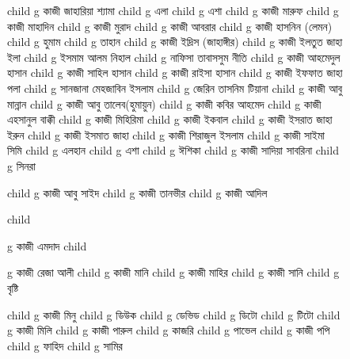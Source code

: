 \documentclass{article}
\begin{document}
\begin{figure}
{\begin{genealogypicture}
{{{{{            child{ g{ কাজী জাহারিয়া শ্যামা  } 
                child{ g{ এলা  }  }
                child{ g{ এশা  }  }
            }
            child{ g{ কাজী মারুফ  }
                child{ g{ কাজী মাহাদিন }  }
              }
            child{ g{ কাজী মুরাদ }
                child{ g{ কাজী আবরার }  }
              }
            child{ g{ কাজী হাসনিন (লেমন) }
              child{ g{ হুমাম  }  }
              child{ g{ তাহান }  }
            }
          }
          child{    g{ কাজী ইদ্রিস (জাহাঙ্গীর) }
                child{ g{ কাজী ইলতুত জাহা ইলা } 
                      child{ g{ ইসমাম আলম নিহাল  }  }
                      child{ g{ নাফিসা তাবাসসুম নীতি }  }
                 } 
                child{ g{ কাজী আহমেদুল হাসান } 
                    child{ g{ কাজী সাহিল হাসান }  }
                    child{ g{ কাজী রাইসা হাসান }  }
                 }
                 child{ g{ কাজী ইফফাত জাহা পলা }
                      child{ g{ সানজানা মেহজাবিন ইসলাম  }  }
                      child{ g{ জেরিন তাসনিম টিয়ানা }  }
                   }
            }
          child{    g{ কাজী আবু মান্নান }   }
          child{   
            g{ কাজী আবু তালেব(হুমায়ুন)  }
              child{ g{ কাজী কবির আহমেদ  }  }
              child{ g{ কাজী এহসানুল বাক্কী }
                  child{ g{ কাজী মিহিরিমা }  }
              }
          }
          child{    g{ কাজী ইকবাল } 
                child{ g{ কাজী ইসরাত জাহা ইরুন }  }
                child{ g{ কাজী ইসমাত জাহা }  }
            }
          child{    g{ কাজী শিরাজুল ইসলাম }  
              child{ g{ কাজী সাইমা সিমি } 
                  child{ g{ এলহান }  }
                  child{ g{ এশা }  }
                  child{ g{ ঈশিকা }  }
              }
              child{ g{ কাজী সাদিয়া সাবরিনা } 
                    child{ g{ সিনরা }  }
              }
           }
        
          child{    g{ কাজী আবু সাইদ }
                  child{ g{ কাজী তানভীর }
                      child{ g{ কাজী আদিল }  }
                    }
             }
          }
          child{    g{ কাজী এমদাদ } 
              child{    g{ কাজী রেজা আলী } 
                    child{    g{ কাজী মানি }
                        child{    g{ কাজী মাহির   }     }
                          }
                    child{    g{ কাজী সানি } child{    g{ বৃষ্টি }  }  }

              }
              child{    g{ কাজী মিনু  } 
              child{    g{  ডিউক }   }
              child{    g{ ডেভিড }   }
              child{    g{ ডিটো }   }
              child{    g{ টিটো }   }
              }
              child{    g{ কাজী মিলি }   }
              child{    g{ কাজী পারুল }
                  child{    g{ কাজরি }   }
                  child{    g{ পাভেল }   }
              }
              child{    g{ কাজী পপি }
                  child{    g{ ফাহিদ }   }
                  child{    g{ সামির }   }
              }

}}}}
\end{genealogypicture}}
\end{figure}
\end{document}
